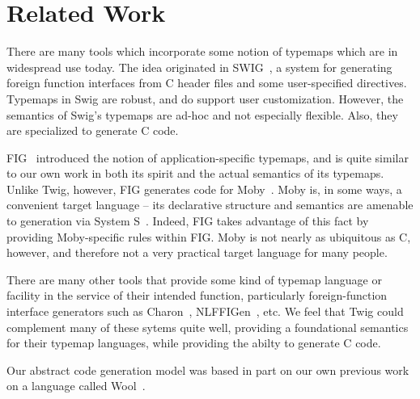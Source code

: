 
\section{Related Work}

There are many tools which incorporate some notion of typemaps which are in widespread use today. The idea originated in SWIG~\cite{swig}, a system for generating foreign function interfaces from C header files and some user-specified directives. Typemaps in Swig are robust, and do support user customization. However, the semantics of Swig's typemaps are ad-hoc and not especially flexible. Also, they are specialized to generate C code.

FIG~\cite{fig} introduced the notion of application-specific typemaps, and is quite similar to our own work in both its spirit and the actual semantics of its typemaps. Unlike Twig, however, FIG generates code for Moby~\cite{moby-classes}. Moby is, in some ways, a convenient target language -- its declarative structure and semantics are amenable to generation via System S~\cite{fisher00interop}. Indeed, FIG takes advantage of this fact by providing Moby-specific rules within FIG. Moby is not nearly as ubiquitous as C, however, and therefore not a very practical target language for many people.

There are many other tools that provide some kind of typemap language or facility in the service of their intended function, particularly foreign-function interface generators such as Charon~\cite{moby-interop-framework}, NLFFIGen~\cite{blume01}, etc. We feel that Twig could complement many of these sytems quite well, providing a foundational semantics for their typemap languages, while providing the abilty to generate C code.

Our abstract code generation model was based in part on our own previous work on a language called Wool~\cite{wool}.
